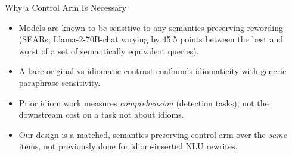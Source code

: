 \documentclass[10pt]{beamer}
\begin{document}
\begin{frame}{Why a Control Arm Is Necessary}
  \begin{itemize}
    \item Models are known to be sensitive to any semantics-preserving rewording
      (SEARs; Llama-2-70B-chat varying by 45.5 points between the best and worst
      of a set of semantically equivalent queries).
    \item A bare original-vs-idiomatic contrast confounds idiomaticity with
      generic paraphrase sensitivity.
    \item Prior idiom work measures \emph{comprehension} (detection tasks),
      not the downstream cost on a task not about idioms.
    \item Our design is a matched, semantics-preserving control arm over the
      \emph{same} items, not previously done for idiom-inserted NLU rewrites.
  \end{itemize}
\end{frame}
\end{document}
